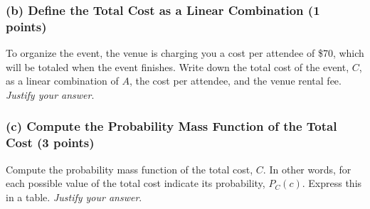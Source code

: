 \documentclass{article}
\begin{document}
\subsubsection*{(b) Define the Total Cost as a Linear Combination (1 points)}

To organize the event, the venue is charging you a cost per attendee of \$70, which will be totaled when the event finishes. Write down the total cost of the event, $C$, as a linear combination of $A$, the cost per attendee, and the venue rental fee. \emph{Justify your answer}.

\begin{center}
\end{center}

\subsubsection*{(c) Compute the Probability Mass Function of the Total Cost (3 points)}

Compute the probability mass function of the total cost, $C$. In other words, for each possible value of the total cost indicate its probability, $P_C(c)$. Express this in a table. \emph{Justify your answer}.

\begin{center}
\end{center}
\end{document}
